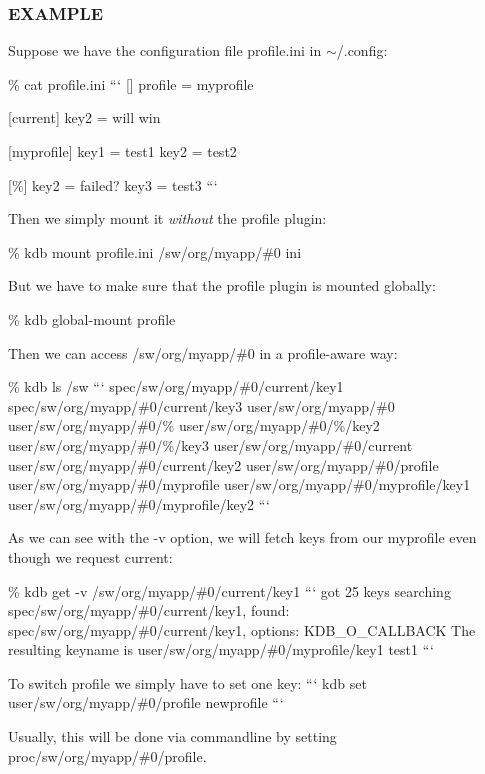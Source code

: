 \subsubsection*{E\+X\+A\+M\+P\+L\+E}

Suppose we have the configuration file profile.\+ini in $\sim$/.config\+:

\% cat profile.\+ini ``` \mbox{[}\mbox{]} profile = myprofile

\mbox{[}current\mbox{]} key2 = will win

\mbox{[}myprofile\mbox{]} key1 = test1 key2 = test2

\mbox{[}\%\mbox{]} key2 = failed? key3 = test3 ```

Then we simply mount it {\itshape without} the profile plugin\+:

\% kdb mount profile.\+ini /sw/org/myapp/\#0 ini

But we have to make sure that the profile plugin is mounted globally\+:

\% kdb global-\/mount profile

Then we can access /sw/org/myapp/\#0 in a profile-\/aware way\+:

\% kdb ls /sw ``` spec/sw/org/myapp/\#0/current/key1 spec/sw/org/myapp/\#0/current/key3 user/sw/org/myapp/\#0 user/sw/org/myapp/\#0/\% user/sw/org/myapp/\#0/\%/key2 user/sw/org/myapp/\#0/\%/key3 user/sw/org/myapp/\#0/current user/sw/org/myapp/\#0/current/key2 user/sw/org/myapp/\#0/profile user/sw/org/myapp/\#0/myprofile user/sw/org/myapp/\#0/myprofile/key1 user/sw/org/myapp/\#0/myprofile/key2 ```

As we can see with the {\ttfamily -\/v} option, we will fetch keys from our {\ttfamily myprofile} even though we request {\ttfamily current}\+:

\% kdb get -\/v /sw/org/myapp/\#0/current/key1 ``` got 25 keys searching spec/sw/org/myapp/\#0/current/key1, found\+: spec/sw/org/myapp/\#0/current/key1, options\+: K\+D\+B\+\_\+\+O\+\_\+\+C\+A\+L\+L\+B\+A\+C\+K The resulting keyname is user/sw/org/myapp/\#0/myprofile/key1 test1 ```

To switch profile we simply have to set one key\+: ``` kdb set user/sw/org/myapp/\#0/profile newprofile ```

Usually, this will be done via commandline by setting {\ttfamily proc/sw/org/myapp/\#0/profile}. 
